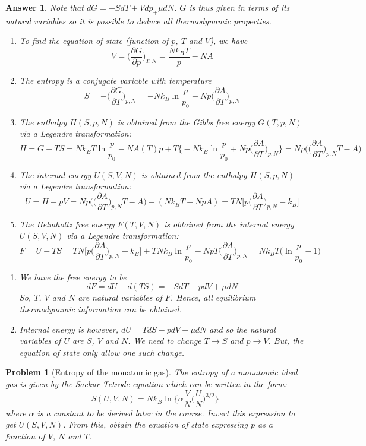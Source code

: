 \documentclass[a4paper]{article}
\theoremstyle{new2}
\newtheorem{ans}{Answer}[section]
\theoremstyle{new}
\newtheorem{qns}{Problem}[section]
\begin{document}
\begin{ans}
Note that $dG=-SdT+Vdp_+\mu dN$. $G$ is thus given in terms of its natural variables so it is possible to deduce all thermodynamic properties.
\begin{enumerate}[label=(\alph*)]
\item To find the equation of state (function of $p$, $T$ and $V$), we have
$$V=\bigg(\frac{\partial G}{\partial p}\bigg)_{T,N}=\frac{Nk_BT}{p}-NA$$
\item The entropy is a conjugate variable with temperature
$$S=-\bigg(\frac{\partial G}{\partial T}\bigg)_{p,N}=-Nk_B\ln\frac{p}{p_0}+Np\bigg(\frac{\partial A}{\partial T}\bigg)_{p,N}$$
\item The enthalpy $H(S,p,N)$ is obtained from the Gibbs free energy $G(T,p,N)$ via a Legendre transformation:
$$H=G+TS=Nk_BT\ln\frac{p}{p_0}-NA(T)p+T\bigg\{-Nk_B\ln\frac{p}{p_0}+Np\bigg(\frac{\partial A}{\partial T}\bigg)_{p,N}\bigg\}=Np\bigg(\bigg(\frac{\partial A}{\partial T}\bigg)_{p,N}T-A\bigg)$$
\item The internal energy $U(S,V,N)$ is obtained from the enthalpy $H(S,p,N)$ via a Legendre transformation:
$$U=H-pV=Np\bigg(\bigg(\frac{\partial A}{\partial T}\bigg)_{p,N}T-A\bigg)-(Nk_BT-NpA)=TN\bigg[p\bigg(\frac{\partial A}{\partial T}\bigg)_{p,N}-k_B\bigg]$$
\item The Helmholtz free  energy $F(T,V,N)$ is obtained from the internal energy $U(S,V,N)$ via a Legendre transformation:
$$F=U-TS=TN\bigg[p\bigg(\frac{\partial A}{\partial T}\bigg)_{p,N}-k_B\bigg]+TNk_B\ln\frac{p}{p_0}-NpT\bigg(\frac{\partial A}{\partial T}\bigg)_{p,N}=Nk_BT\bigg(\ln\frac{p}{p_0}-1\bigg)$$
\end{enumerate}
\begin{enumerate}[label=\roman*]
\item We have the free energy to be
$$dF=dU-d(TS)=-SdT-pdV+\mu dN$$
So, $T$, $V$ and $N$ are natural variables of $F$. Hence, all equilibrium thermodynamic information can be obtained.
\item Internal energy is however, $dU=TdS-pdV+\mu dN$ and so the natural variables of $U$ are $S$, $V$ and $N$. We need to change $T\rightarrow S$ and $p\rightarrow V$. But, the equation of state only allow one such change.
\end{enumerate}
\end{ans}
\begin{qns}[Entropy of the monatomic gas]
The entropy of a monatomic ideal gas is given by the Sackur-Tetrode equation which can be written in the form:
$$S(U,V,N)=Nk_B\ln\bigg\{\alpha\frac{V}{N}\bigg(\frac{U}{N}\bigg)^{3/2}\bigg\}$$
where $\alpha$ is a constant to be derived later in the course. Invert this expression to get $U(S, V, N)$. From this, obtain the equation of state expressing $p$ as a function of $V$, $N$ and $T$.
\end{qns}
\end{document}
